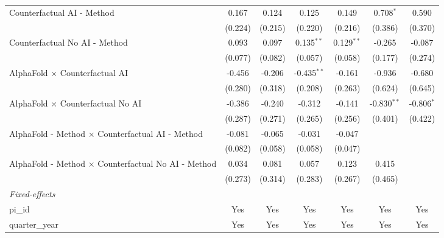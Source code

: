 \begin{tabular}{lcccccc}
   Counterfactual AI - Method                                 & 0.167        & 0.124   & 0.125         & 0.149        & 0.708$^{*}$   & 0.590\\   
                                                              & (0.224)      & (0.215) & (0.220)       & (0.216)      & (0.386)       & (0.370)\\   
   Counterfactual No AI - Method                              & 0.093        & 0.097   & 0.135$^{**}$  & 0.129$^{**}$ & -0.265        & -0.087\\   
                                                              & (0.077)      & (0.082) & (0.057)       & (0.058)      & (0.177)       & (0.274)\\   
   AlphaFold $\times$ Counterfactual AI                       & -0.456       & -0.206  & -0.435$^{**}$ & -0.161       & -0.936        & -0.680\\   
                                                              & (0.280)      & (0.318) & (0.208)       & (0.263)      & (0.624)       & (0.645)\\   
   AlphaFold $\times$ Counterfactual No AI                    & -0.386       & -0.240  & -0.312        & -0.141       & -0.830$^{**}$ & -0.806$^{*}$\\   
                                                              & (0.287)      & (0.271) & (0.265)       & (0.256)      & (0.401)       & (0.422)\\   
   AlphaFold - Method $\times$ Counterfactual AI - Method     & -0.081       & -0.065  & -0.031        & -0.047       &               &   \\   
                                                              & (0.082)      & (0.058) & (0.058)       & (0.047)      &               &   \\   
   AlphaFold - Method $\times$ Counterfactual No AI - Method  & 0.034        & 0.081   & 0.057         & 0.123        & 0.415         &   \\   
                                                              & (0.273)      & (0.314) & (0.283)       & (0.267)      & (0.465)       &   \\   
   \midrule
   \emph{Fixed-effects}\\
   pi\_id                                                     & Yes          & Yes     & Yes           & Yes          & Yes           & Yes\\  
   quarter\_year                                              & Yes          & Yes     & Yes           & Yes          & Yes           & Yes\\  

\end{tabular}
